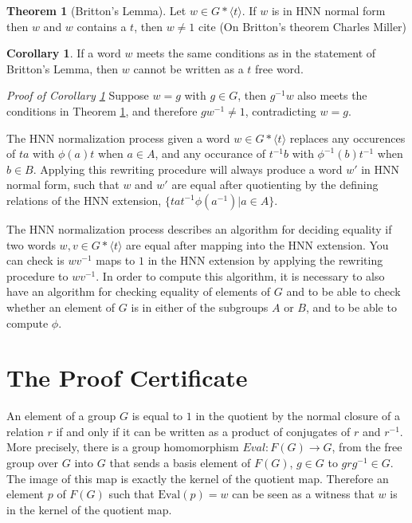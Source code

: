 \documentclass[11pt]{article} %
\theoremstyle{definition}
\newtheorem{theorem}{Theorem}[section]
\theoremstyle{definition}
\newtheorem{corol}{Corollary}[theorem]
\theoremstyle{definition}
\theoremstyle{definition}
\theoremstyle{definition}
\theoremstyle{definition}
\begin{document}
\begin{theorem}[Britton's Lemma]\label{britton}
  Let $w \in G \ast \langle t \rangle$.
  If $w$ is in HNN normal form then $w$
  and $w$ contains a $t$, then $w \ne 1$
  cite (On Britton's theorem Charles Miller)
\end{theorem}

\begin{corol}\label{genbritton}
  If a word $w$ meets the same conditions as in the statement of Britton's Lemma,
  then $w$ cannot be written as a $t$ free word.
\end{corol}
\textit{Proof of Corollary \ref{genbritton}} Suppose $w = g$ with $g \in G$,
then $g^{-1}w$ also meets the conditions
in Theorem \ref{britton}, and therefore $gw^{-1}\ne 1$, contradicting $w = g$.

The HNN normalization process given a word $w \in G \ast \langle t \rangle$
replaces any occurences of $ta$ with $\phi(a)t$ when $a \in A$, and
any occurance of $t^{-1}b$ with $\phi^{-1}(b)t^{-1}$ when $b \in B$.
Applying this rewriting procedure will always produce a word $w'$ in HNN normal form,
such that $w$ and $w'$ are equal after quotienting by the defining relations
of the HNN extension, $\{ta t^{-1} \phi(a^{-1}) | a \in A\}$.

The HNN normalization process describes an algorithm for deciding
equality if two words $w, v \in G \ast \langle t \rangle$ are equal
after mapping into the HNN extension. You can check is $wv^{-1}$ maps to
$1$ in the HNN extension by applying the rewriting procedure to $wv^{-1}$.
In order to compute this algorithm, it is necessary to also
have an algorithm for checking equality of elements of $G$ and
to be able to check whether an element of $G$ is in either of the subgroups $A$ or $B$,
and to be able to compute $\phi$.

\section{The Proof Certificate}

An element of a group $G$ is equal to $1$ in the quotient by the normal closure
of a relation $r$ if and only if it can be written as a product of conjugates of $r$ and $r^{-1}$.
More precisely, there is a group homomorphism $\textit{Eval} : F(G) \to G$, from the free group
over $G$ into $G$ that sends a basis element of $F(G)$,
$g \in G$ to $grg^{-1} \in G$. The image of this map is exactly the kernel of the quotient map.
Therefore an element $p$ of $F(G)$ such that $\text{Eval}(p) = w$
can be seen as a witness that $w$ is in the kernel of the quotient map.
\end{document}
